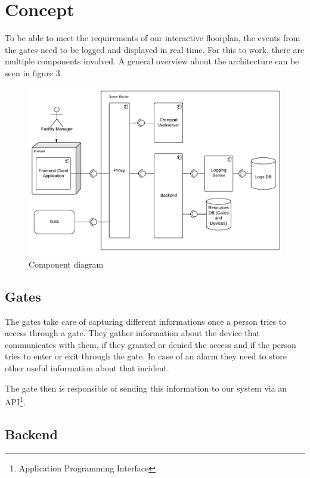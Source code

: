 \section{Concept}
To be able to meet the requirements of our interactive floorplan, the events from the gates need to be logged and displayed in real-time. For this to work, there are multiple components involved. A general overview about the architecture can be seen in figure 3.

\begin{figure}[!hb]
	\centering
	\includegraphics[width=1\linewidth]{images/Komponentendiagramm}
	\caption{Component diagram}
	\label{fig:Komponentendiagramm}
\end{figure}

\subsection{Gates}
\label{Gates}

The gates take care of capturing different informations once a person tries to access through a gate. They gather information about the device that communicates with them, if they granted or denied the access and if the person tries to enter or exit through the gate. In case of an alarm they need to store other useful information about that incident.

The gate then is responsible of sending this information to our system via an API\footnote{Application Programming Interface}.


\subsection{Backend}
\label{Backend}

